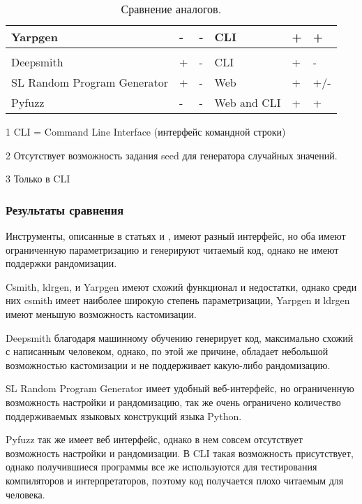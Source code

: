 \begin{table}[ht]
\begin{threeparttable}[t]
\begin{tabular}{p{5.1em}|m{4em}m{5em}m{4em}m{4em}m{4em}}
    Yarpgen                                                          & -                    & -                       & CLI                 & +                    & +                      \\
    \hline                                                                                                                                                                                  \\
    Deepsmith                                                        & +                    & -                       & CLI                 & +                    & -                      \\
    \hline
    SL Random Program Generator & + & - & Web & + & +/-\tnote{2}   \\
    \hline
    Pyfuzz & - & - & Web and CLI & +\tnote{3}   & +\tnote{3}  \\
    \hline
\end{tabular}
\caption{
    \label{table-smth}
    Сравнение аналогов.}
\begin{tablenotes}
 \item[1] CLI = Command Line Interface (интерфейс командной строки)
 \item[2] Отсутствует возможность задания seed для генератора случайных значений.
 \item[3] Только в CLI
\end{tablenotes}
\end{threeparttable}
\end{table}
\clearpage

\subsubsection{Результаты сравнения}

Инструменты, описанные в статьях \cite{pg-eli} и \cite{acg-2021}, имеют разный интерфейс, но оба
имеют ограниченную параметризацию и генерируют читаемый код, однако не имеют поддержки рандомизации.

Csmith, ldrgen, и Yarpgen имеют схожий функционал и недостатки, однако среди них csmith имеет наиболее
широкую степень параметризации, Yarpgen и ldrgen имеют меньшую возможность кастомизации.

Deepsmith благодаря машинному обучению генерирует код, максимально схожий с написанным человеком,
однако, по этой же причине, обладает небольшой возможностью кастомизации и не поддерживает какую-либо
рандомизацию.

SL Random Program Generator имеет удобный веб-интерфейс, но ограниченную возможность
настройки и рандомизацию, так же очень ограничено количество поддерживаемых языковых конструкций языка Python.

Pyfuzz так же имеет веб интерфейс, однако в нем совсем отсутствует возможность настройки и рандомизации.
В CLI такая возможность присутствует, однако получившиеся программы все же используются для 
тестирования компиляторов и интерпретаторов, поэтому код получается плохо читаемым для человека.